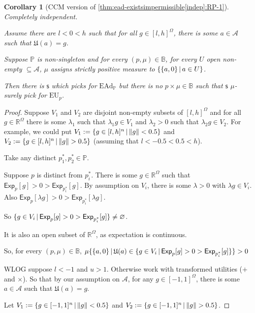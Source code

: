 \documentclass[a4paper]{article}
\newtheorem{corollary}[theorem]{Corollary}
\newcommand\A{\mathcal{A}}
\renewcommand\P{\mathbb{P}} %
\newcommand\Exp{\mathsf{Exp}}
\newcommand\EU{\mathrm{EU}}
\newcommand\EAd{\mathrm{EAd}}
\newcommand\U{\mathfrak{U}} %
\newcommand\s{\mathsf{s}}
\newcommand{\IB}{\mathbb{B}}
\newcommand{\IP}{\P}
\renewcommand{\Re}{\mathbb{R}}
\renewcommand{\color}[1]{}
\newenvironment{colored}[1]{\leavevmode\color{#1}}{}
\newcommand\SetDelimiter[1][]{
	\nonscript\,#1\vert \allowbreak \nonscript\,\mathopen{}}
\providecommand\given{\SetDelimiter}
\renewcommand{\emptyset}{\varnothing}
\newenvironment{CCM rewritten}
{\begingroup\color{blue}} %
{\endgroup}              %
\begin{document}
\begin{corollary}[CCM version of \cref{thm:ead-existsimpermissible[indep]:RP-1}]\label{thm:ead-existsimpermissible[indep]:CCM-1:nondegentakeleave}
	Completely independent. 
	
	Assume there are $l<0<h$ such that for all $g\in[l,h]^\Omega$, there is some $a\in\A$ such that $\U(a)=g$. 
	
	Suppose $\IP$ is non-singleton and for every $(p,\mu)\in\IB$, for every $U$ open non-empty $\subseteq\A$, $\mu$ assigns strictly positive measure to $\{\{a,0\}\given a\in U\}$.
	
	Then there is $\s$ which picks for $\EAd_\IP$ but there is no $p\times\mu\in \IB$ such that $\s$ $\mu$-surely pick for $\EU_p$.
\end{corollary}
\begin{proof}
	
	Suppose $V_1$ and $V_2$ are disjoint non-empty subsets of $[l,h]^\Omega$ and for all $g\in \Re^\Omega$ there is some $\lambda_1$ such that $\lambda_1 g\in V_1$ and $\lambda_2>0$ such that $\lambda_2 g\in V_2$. 
	For example, we could put  $V_1:=\{g\in[l,h]^n\given \|g\|<0.5\}$ and $V_2:=\{g\in[l,h]^n\given \|g\|>0.5\}$ (assuming that $l<-0.5<0.5<h$). 
	
	Take any distinct $p^*_1,p^*_2\in \IP$.
	
	Suppose $p$ is distinct from $p^*_i$. 
	There is some $g\in\Re^\Omega$ such that $\Exp_p[g]>0>\Exp_{p^*_i}[g]$. 
	By assumption on $V_i$, there is some $\lambda >0$ with $\lambda g\in V_i$. Also $\Exp_p[\lambda g]>0>\Exp_{p^*_i}[\lambda g]$. 
	
	So $\{g\in V_i\given \Exp_p[g]>0>\Exp_{p^*_i}[g]\}\neq \emptyset$. 
	
	It is also an open subset of $\Re^\Omega$, as expectation is continuous. 
	
	So, for every $(p,\mu)\in\IB$, $\mu\{\{a,0\}\given \U(a)\in\{g\in V_i\given \Exp_p[g]>0>\Exp_{p^*_i}[g]\} \}>0$
	
	
	\begin{colored}{red}
		
	
	
	
	
	

	WLOG suppose $l<-1$ and $u>1$.  Otherwise work with transformed utilities ($+$ and $\times$). 
	So that by our assumption on $\A$, for any $g\in[-1,1]^\Omega$, there is some $a\in \A$ such that $\U(a)=g$. 
	
	Let $V_1:=\{g\in[-1,1]^n\given \|g\|<0.5\}$ and $V_2:=\{g\in[-1,1]^n\given \|g\|>0.5\}$. 
	

\end{colored}
\end{proof}
\end{document}
